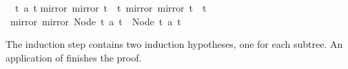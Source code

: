 \begin{isabellebody}
\begin{isamarkuptxt}
\begin{isabelle}
\ {}{}\ {}t{}\ a\ t{}{}\isanewline
{}mirror\ {}mirror\ t{}{}\ {}\ t{}{}\ mirror\ {}mirror\ t{}{}\ {}\ t{}{}\isanewline
{}\ mirror\ {}mirror\ {}Node\ t{}\ a\ t{}{}{}\ {}\ Node\ t{}\ a\ t{}%
\end{isabelle}
The induction step contains two induction hypotheses, one for each subtree.
An application of  finishes the proof.


\end{isamarkuptxt}
\end{isabellebody}
